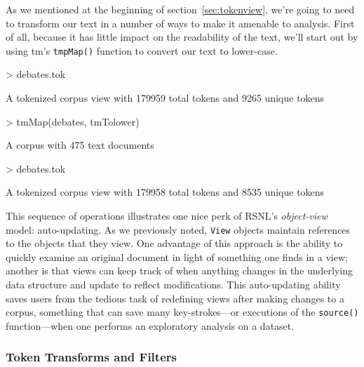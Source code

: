 \documentclass[11pt]{article}
\def\RSNL{{\normalfont\fontseries{b}\selectfont RSNL}}
\def\tm{{\normalfont\fontseries{b}\selectfont tm}}
\let\code=\texttt
\let\rclass=\texttt
\begin{document}
As we mentioned at the beginning of section~\ref{sec:tokenview},
we're going to need to transform our text in a number of ways to make
it amenable to analysis.  First of all, because it has little impact
on the readability of the text, we'll start out by using \tm's
\code{tmpMap()} function to convert our text to lower-case.
\begin{Schunk}
\begin{Sinput}
> debates.tok
\end{Sinput}
\begin{Soutput}
A tokenized corpus view with 179959 total tokens and 9265 unique tokens
\end{Soutput}
\begin{Sinput}
> tmMap(debates, tmTolower)
\end{Sinput}
\begin{Soutput}
A corpus with 475 text documents
\end{Soutput}
\begin{Sinput}
> debates.tok
\end{Sinput}
\begin{Soutput}
A tokenized corpus view with 179958 total tokens and 8535 unique tokens
\end{Soutput}
\end{Schunk}
This sequence of operations illustrates one nice perk of \RSNL's
\emph{object-view} model: auto-updating.  As we previously noted,
\rclass{View} objects maintain references to the objects that they
view.  One advantage of this approach is the ability to quickly
examine an original document in light of something one finds in a
view; another is that views can keep track of when anything changes in
the underlying data structure and update to reflect modifications.
This auto-updating ability saves users from the tedious task of
redefining views after making changes to a corpus, something that can
save many key-strokes---or executions of the \code{source()}
function---when one performs an exploratory analysis on a dataset.

\subsubsection{Token Transforms and Filters}
\end{document}
